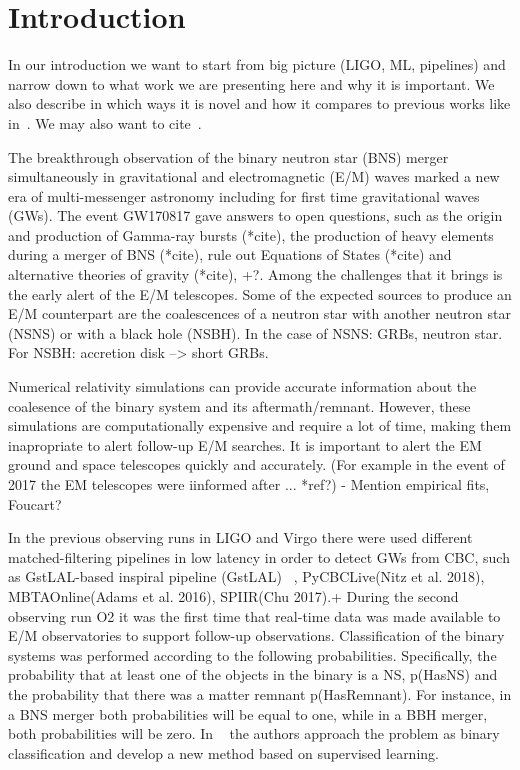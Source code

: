\section{Introduction}
In our introduction we want to start from big picture (LIGO, ML, pipelines)
and narrow down to what work we are presenting here and why it is important. We
also describe in which ways it is novel and how it compares to previous works
like in~\cite{Chatterjee:2019avs}. We may also want to cite~\cite{Sachdev:2020lfd}. 


The breakthrough observation of the binary neutron star (BNS) merger simultaneously in gravitational and electromagnetic (E/M) waves \cite{LIGOScientific:2017ync} marked a new era of multi-messenger astronomy including for first time gravitational waves (GWs). The event GW170817 gave answers to open questions, such as the origin and production of Gamma-ray bursts (*cite), the production of heavy elements during a merger of BNS (*cite), rule out Equations of States (*cite) and alternative theories of gravity (*cite), +?. Among the challenges that it brings is the early alert of the E/M telescopes. Some of the expected sources to produce an E/M counterpart are the coalescences of a neutron star with another neutron star (NSNS) or with a black hole (NSBH). In the case of NSNS: GRBs, neutron star. For NSBH: accretion disk --> short GRBs.

Numerical relativity simulations can provide accurate information about the coalesence of the binary system and its aftermath/remnant. However, these simulations are computationally expensive and require a lot of time, making them inapropriate to alert follow-up E/M searches. It is important to alert the EM ground and space telescopes quickly and accurately. (For example in the event of 2017 the EM telescopes were iinformed after ... *ref?)
- Mention empirical fits, Foucart?

 
In the previous observing runs in LIGO and Virgo there were used different matched-filtering pipelines in low latency in order to detect GWs from CBC, such as GstLAL-based inspiral pipeline (GstLAL) ~\cite{Sachdev:2020lfd}, PyCBCLive(Nitz et al. 2018), MBTAOnline(Adams et al. 2016), SPIIR(Chu 2017).+ During the second observing run O2 it was the first time that real-time data was made available to E/M observatories to support follow-up observations. Classification of the binary systems was performed according to the following probabilities. Specifically, the probability that at least one of the objects in the binary is a NS, p(HasNS) and the probability that there was a matter remnant p(HasRemnant). For instance, in a BNS merger both probabilities will be equal to one, while in a BBH merger, both probabilities will be zero. In ~\cite{Chatterjee:2019avs} the authors approach the problem as binary classification and develop a new method based on supervised learning.


